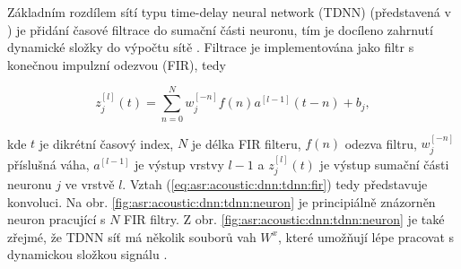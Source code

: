 Základním rozdílem sítí typu time-delay neural network (TDNN) (představená v \cite{Waibel1989}) je přidání časové filtrace do sumační části neuronu, tím je docíleno zahrnutí dynamické složky do výpočtu sítě \cite{Craig2000}. Filtrace je implementována jako filtr s konečnou impulzní odezvou (FIR), tedy

\begin{equation}
  z_{j}^{[l]}\left(t\right) = \sum_{n=0}^{N} w_{j}^{[-n]}f\left(n\right)a^{[l-1]}\left(t - n\right) + b_{j},
  \label{eq:asr:acoustic:dnn:tdnn:fir}
\end{equation}

\noindent kde $t$ je dikrétní časový index, $N$ je délka FIR filteru, $f\left(n\right)$ odezva filtru, $w_{j}^{[-n]}$ příslušná váha, $a^{[l-1]}$ je výstup vrstvy $l-1$ a $z_{j}^{[l]}\left(t\right)$ je výstup sumační části neuronu $j$ ve vrstvě $l$. Vztah (\ref{eq:asr:acoustic:dnn:tdnn:fir}) tedy představuje konvoluci. Na obr. \ref{fig:asr:acoustic:dnn:tdnn:neuron} je principiálně znázorněn neuron pracující s $N$ FIR filtry. Z obr. \ref{fig:asr:acoustic:dnn:tdnn:neuron} je také zřejmé, že TDNN síť má několik souborů vah $W^{x}$, které umožňují lépe pracovat s dynamickou složkou signálu \cite{Peddinti2015}.

